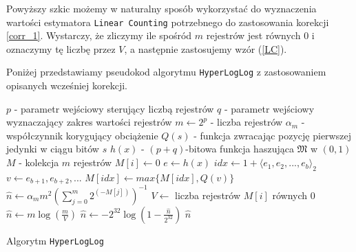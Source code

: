 Powyższy szkic możemy w naturalny sposób wykorzystać do wyznaczenia wartości  estymatora \texttt{Linear Counting} potrzebnego do zastosowania korekcji \ref{corr_1}. Wystarczy, że zliczymy ile spośród  $m$ rejestrów jest równych $0$ i oznaczymy tę liczbę przez $V$, a następnie zastosujemy wzór (\ref{LC}).

Poniżej przedstawiamy pseudokod algorytmu \texttt{HyperLogLog} z zastosowaniem opisanych wcześniej korekcji.

\begin{algorithm}[H]
    \begin{algorithmic}
    \State $p $ - parametr wejściowy sterujący liczbą rejestrów
    \State $q $ - parametr wejściowy wyznaczający zakres wartości rejestrów
    \State $m \gets 2^p$ - liczba rejestrów
    \State ${\alpha}_m $ - współczynnik korygujący obciążenie
    \State $Q(s) $ -  funkcja zwracając pozycję pierwszej jedynki w ciągu bitów $s$ 
    \State $h(x)  $  - $(p + q)$-bitowa funkcja haszująca $\mathfrak{M}$ w $(0, 1)$
    \State $M $  - kolekcja $m$ rejestrów 
    \newline
        \State $M[i] \gets 0$
    \EndFor
    \newline
        \State $e \gets h(x)$
        \State $idx \gets 1 + {{\langle}e_1, e_2, ..., e_b{\rangle}}_2$
        \State $v \gets e_{b+1}, e_{b+2}, ...$
        \State $M[idx] \gets max\{M[idx], Q(v)\}$
    \EndFunction
    \newline
        \State $\hat{n} \gets {\alpha}_{m}{m}^2(\sum_{j=0}^{m} 2^{(-M[j])})^{-1}$
            \State $V \gets $ liczba rejestrów $M[i]$ równych $0$
                \State $\hat{n} \gets {m}\log(\frac{m}{V})$
            \EndIf
            \State $\hat{n} \gets -2^{32}\log(1 - \frac{\hat{n}}{2^{32}})$
        \EndIf
        \State \Return $\hat{n}$
    \EndFunction
    
    \end{algorithmic}
    \caption{Algorytm \texttt{HyperLogLog}}
\end{algorithm}






